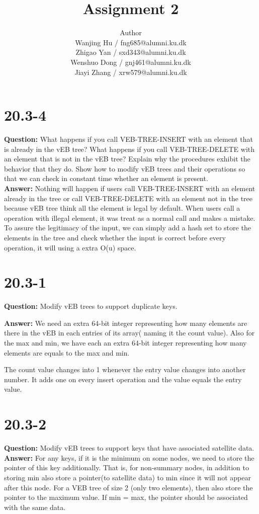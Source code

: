 \documentclass[12pt]{article}
\title{Assignment 2}
\author{Author \\
  Wanjing Hu / fng685@alumni.ku.dk  \\
  Zhigao Yan / sxd343@alumni.ku.dk  \\
  Wenshuo Dong / gnj461@alumni.ku.dk  \\
  Jiayi Zhang / xrw579@alumni.ku.dk \\
}
\begin{document}
\maketitle

\section{20.3-4}
\textbf{Question: } 
What happens if you call VEB-TREE-INSERT with an element that is already in the vEB tree? What happens if you call VEB-TREE-DELETE with an element that is not in the vEB tree? Explain why the procedures exhibit the behavior that they do. Show how to modify vEB trees and their operations so that we can check in constant time whether an element is present.\\
\textbf{Answer:}
Nothing will happen if users call VEB-TREE-INSERT with an element already in the tree or call VEB-TREE-DELETE with an element not in the tree because vEB tree think all the element is legal by default. When users call a operation with illegal element, it was treat as a normal call and makes a mistake.\\
To assure the legitimacy of the input, we can simply add a hash set to store the elements in the tree and check whether the input is correct before every operation, it will using a extra O(u) space.

\section{20.3-1}
\textbf{Question: } 
Modify vEB trees to support duplicate keys.

\textbf{Answer:}
We need an extra 64-bit integer representing how many elements are there in the vEB in each entries of its array( naming it the count value). Also for the max and min, we have each an extra  64-bit integer representing how many elements are equals to the max and min. 

The count value changes into 1 whenever the entry value changes into another number. It adds one on every insert operation and the value equals the entry value.

\section{20.3-2}
\textbf{Question:} Modify vEB trees to support keys that have associated satellite data.\\
\textbf{Answer:} For any keys, if it is the minimum on some nodes, we need to store the pointer of this key additionally. That is, for non-summary nodes, in addition to storing min also store a pointer(to satellite data) to min since it will not appear after this node.
For a VEB tree of size 2 (only two elements), then also store the pointer to the maximum value. If min = max, the pointer should be associated with the same data. 
\end{document}
